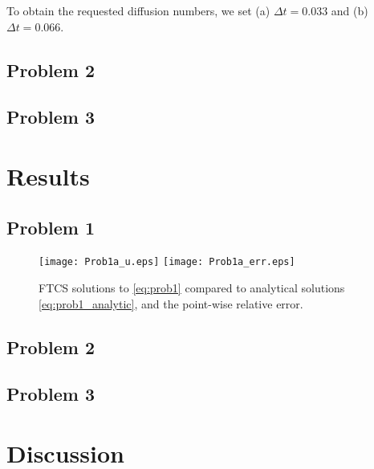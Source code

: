 \documentclass[11pt]{article}
\begin{document}
To obtain the requested diffusion numbers, we set (a) $\Delta t = 0.033$ and (b) $\Delta t = 0.066$.

\subsection{Problem 2}

\subsection{Problem 3}

\section{Results} %

\subsection{Problem 1}

\begin{figure}[h!]
\begin{center}
\texttt{[image: Prob1a\_u.eps]}
\texttt{[image: Prob1a\_err.eps]}
\\[-0.5cm]
\caption{FTCS solutions to \eqref{eq:prob1} compared to analytical solutions \eqref{eq:prob1_analytic}, and the point-wise relative error.}
\label{fig:Prob2}
\end{center}
\end{figure}

\subsection{Problem 2}

\subsection{Problem 3}

\section{Discussion} %
\end{document}

